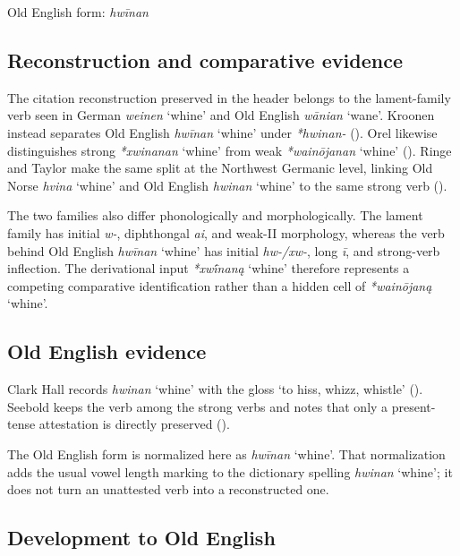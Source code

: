 \documentclass[
  british,
  a4paper,
  openany]{book}
\providecommand{\Recon}[1]{\emph{*#1}}
{\catcode`→=\active \global\def→{\ensuremath{\rightarrow}}}
\providecommand{\Recon}[1]{\emph{*#1}}
{\catcode`→=\active \global\def→{\ensuremath{\rightarrow}}}
\begin{document}
Old English form: \emph{hwīnan}

\subsection{Reconstruction and comparative
evidence}\label{reconstruction-and-comparative-evidence-104}

The citation reconstruction preserved in the header belongs to the
lament-family verb seen in German {\emph{weinen}} `whine' and Old
English {\emph{wānian}} `wane'. Kroonen instead separates Old English
{\emph{hwīnan}} `whine' under \emph{*hwinan-}
(). Orel likewise
distinguishes strong {\Recon{xwinanan} `whine'} from weak
{\Recon{wainōjanan} `whine'} ().
Ringe and Taylor make the same split at the Northwest Germanic level,
linking Old Norse {\emph{hvina}} `whine' and Old English {\emph{hwinan}}
`whine' to the same strong verb ().

The two families also differ phonologically and morphologically. The
lament family has initial \emph{w-}, diphthongal \emph{ai}, and weak-II
morphology, whereas the verb behind Old English \emph{hwīnan} `whine'
has initial \emph{hw-/xw-}, long \emph{ī}, and strong-verb inflection.
The derivational input {\Recon{xwī́naną} `whine'} therefore represents a
competing comparative identification rather than a hidden cell of
\Recon{wainōjaną} `whine'.

\subsection{Old English evidence}\label{old-english-evidence-104}

Clark Hall records {\emph{hwinan}} `whine' with the gloss `to hiss,
whizz, whistle' ().
Seebold keeps the verb among the strong verbs and notes that only a
present-tense attestation is directly preserved
().

The Old English form is normalized here as {\emph{hwīnan}} `whine'. That
normalization adds the usual vowel length marking to the dictionary
spelling {\emph{hwinan}} `whine'; it does not turn an unattested verb
into a reconstructed one.

\subsection{Development to Old
English}\label{development-to-old-english-104}
\end{document}
